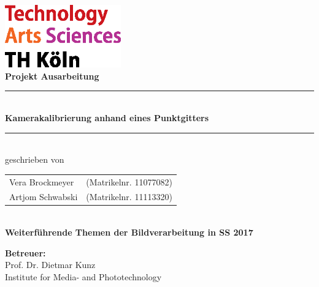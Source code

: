 \thispagestyle{empty}
\begin{center}
	\includegraphics[width=5cm]{Images/logo_TH}\\[12ex]
	{\Huge\textbf{Projekt Ausarbeitung}}\\[8ex]
	\rule{.8\textwidth}{.2pt}
	{\Large\\[1ex] \textbf{Kamerakalibrierung anhand eines Punktgitters }}\\
	\rule{.8\textwidth}{.2pt}\\[10ex]
	geschrieben von\\[2ex]
	\begin{tabular}{ll}
		Vera Brockmeyer &(Matrikelnr. 11077082)\\
		Artjom Schwabski &(Matrikelnr. 11113320)\\
	\end{tabular}\\[10ex]
	\textbf{Weiterführende Themen der Bildverarbeitung in SS 2017}\\			
\end{center}
\vfill
\begin{flushleft}
	{\bf Betreuer:}\\
	Prof. Dr. Dietmar Kunz\\
	Institute for Media- and Phototechnology
\end{flushleft}
\newpage